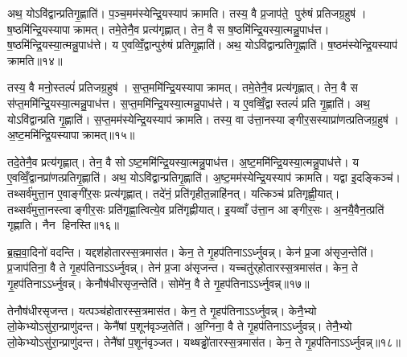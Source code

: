 अथ॒ योऽवि॑द्वान्प्रतिगृ॒ह्णाति॑। प॒ञ्च॒मम॑स्येन्द्रि॒यस्याप॑ क्रामति। तस्य॒ वै प्र॒जाप॑ते॒ पुरु॑षं प्रतिजग्र॒हुष॑। ष॒ष्ठमि॑न्द्रि॒यस्यापाक्रामत्। तमे॒तेनै॒व प्रत्य॑गृह्णात्। तेन॒ वै स ष॒ष्ठमि॑न्द्रि॒यस्या॒त्मन्नु॒पाध॑त्त। ष॒ष्ठमि॑न्द्रि॒यस्या॒त्मन्नु॒पाध॑त्ते। य ए॒वव्विँ॒द्वान्पुरु॑षं प्रतिगृ॒ह्णाति॑। अथ॒ योऽवि॑द्वान्प्रतिगृ॒ह्णाति॑। ष॒ष्ठम॑स्येन्द्रि॒यस्याप॑ क्रामति॥१४॥

तस्य॒ वै मनो॒स्तल्पं॑ प्रतिजग्र॒हुष॑। स॒प्त॒ममि॑न्द्रि॒यस्यापाक्रामत्। तमे॒तेनै॒व प्रत्य॑गृह्णात्। तेन॒ वै स स॑प्त॒ममि॑न्द्रि॒यस्या॒त्मन्नु॒पाध॑त्त। स॒प्त॒ममि॑न्द्रि॒यस्या॒त्मन्नु॒पाध॑त्ते। य ए॒वव्विँ॒द्वास्तल्पं॑ प्रति गृ॒ह्णाति॑। अथ॒ योऽवि॑द्वान्प्रति गृ॒ह्णाति॑। स॒प्त॒मम॑स्येन्द्रि॒यस्याप॑ क्रामति। तस्य॒ वा उ॑त्ता॒नस्याङ्गीर॒सस्याप्रा॑णत्प्रतिजग्र॒हुष॑। अ॒ष्ट॒ममि॑न्द्रि॒यस्यापाक्रामत्॥१५॥

तदे॒तेनै॒व प्रत्य॑गृह्णात्। तेन॒ वै सोऽष्ट॒ममि॑न्द्रि॒यस्या॒त्मन्नु॒पाध॑त्त। अ॒ष्ट॒ममि॑न्द्रि॒यस्या॒त्मन्नु॒पाध॑त्ते। य ए॒वव्विँ॒द्वानप्रा॑णत्प्रतिगृ॒ह्णाति॑। अथ॒ योऽवि॑द्वान्प्रतिगृ॒ह्णाति॑। अ॒ष्ट॒मम॑स्येन्द्रि॒यस्याप॑ क्रामति। यद्वा इ॒दङ्किञ्च॑। तथ्सर्व॑मुत्ता॒न ए॒वाङ्गी॑र॒सः प्रत्य॑गृह्णात्। तदे॑नं॒ प्रति॑गृहीत॒न्नाहि॑नत्। यत्किञ्च॑ प्रतिगृह्णी॒यात्। तथ्सर्व॑मुत्ता॒नस्त्वाङ्गीर॒सः प्रति॑गृह्णा॒त्वित्ये॒व प्रति॑गृह्णीयात्। इ॒यव्वाँ उ॑त्ता॒न आङ्गीर॒सः। अ॒नयै॒वैन॒त्प्रति॑ गृह्णाति। नैन हिनस्ति॥१६॥\anuvakamend[तृती॑यमिन्द्रि॒यस्यापाक्रामच्चतु॒र्थमि॑न्द्रि॒यस्या॒त्मन्नु॒पाध॒त्ताश्वं॑ प्रतिगृ॒ह्णाति॑ ष॒ष्ठम॑स्येन्द्रि॒यस्याप॑क्रामत्यष्ट॒ममि॑न्द्रि॒यस्यापाक्रामत्प्रतिगृह्णी॒याच्च॒त्वारि॑ च (तस्य॒ वा अ॒ग्नेर्‌हिर॑ण्य॒ सोम॑स्य॒ वास॒स्तदे॒तेन॑ रु॒द्रस्य॒ गान्तामे॒तेन॒ वरु॑ण॒स्याश्वं॑ प्र॒जाप॑ते॒ पुरु॑षं॒ मनो॒स्तल्प॒न्तमे॒तेनोत्ता॒नस्य॒ तदे॒तेनाप्रा॑ण॒द्यद्वै। अ॒र्धं तृती॑यमष्ट॒मं तच्च॑तु॒र्थं तां प॑ञ्च॒म ष॒ष्ठ स॑प्त॒मन्तम्। तदे॒तेन॒ द्वे तामे॒तेनैकं॒ तमे॒तेन॒ त्रीणि॒ तदे॒तेनैकम् ॥ )]

ब्र॒ह्म॒वा॒दिनो॑ वदन्ति। यद्दश॑होतारस्स॒त्रमास॑त। केन॒ ते गृ॒हप॑तिनाऽऽर्ध्नुवन्न्। केन॑ प्र॒जा अ॑सृज॒न्तेति॑। प्र॒जाप॑तिना॒ वै ते गृ॒हप॑तिनाऽऽर्ध्नुवन्न्। तेन॑ प्र॒जा अ॑सृजन्त। यच्चतु॑र्‌होतारस्स॒त्रमास॑त। केन॒ ते गृ॒हप॑तिनाऽऽर्ध्नुवन्न्। केनौष॑धीरसृज॒न्तेति॑। सोमे॑न॒ वै ते गृ॒हप॑तिनाऽऽर्ध्नुवन्न्॥१७॥

तेनौष॑धीरसृजन्त। यत्पञ्च॑होतारस्स॒त्रमास॑त। केन॒ ते गृ॒हप॑तिनाऽऽर्ध्नुवन्न्। केनै॒भ्यो लो॒केभ्योऽसु॑रा॒न्प्राणु॑दन्त। केनै॑षां प॒शून॑वृञ्ज॒तेति॑। अ॒ग्निना॒ वै ते गृ॒हप॑तिनाऽऽर्ध्नुवन्न्। तेनै॒भ्यो लो॒केभ्योऽसु॑रा॒न्प्राणु॑दन्त। तेनै॑षां प॒शून॑वृञ्जत। यथ्षड्ढो॑तारस्स॒त्रमास॑त। केन॒ ते गृ॒हप॑तिनाऽऽर्ध्नुवन्न्॥१८॥


